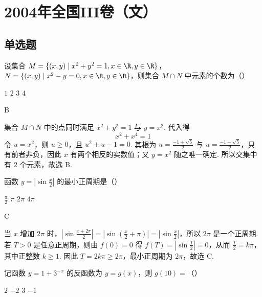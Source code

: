 \chapter{2004年全国III卷（文）}
\section{单选题}
\begin{problem}
设集合 \(M = \{(x, y) \mid x^2 + y^2 = 1, x \in \R, y \in \R\}\)，\(N = \{(x, y) \mid x^2 - y = 0, x \in \R, y \in \R\}\)，则集合 \(M \cap N\) 中元素的个数为（\quad）

\choices
    {\(1\)}
    {\(2\)}
    {\(3\)}
    {\(4\)}
\end{problem}

\begin{answer}
B
\end{answer}

\begin{solution}
集合 \(M\cap N\) 中的点同时满足 \(x^2+y^2=1\) 与 \(y=x^2\). 代入得
\[
x^2+x^4=1
\]
令 \(u=x^2\)，则 \(u\geqslant0\)，且 \(u^2+u-1=0\). 其根为 \(u=\frac{-1+\sqrt{5}}{2}\) 与 \(u=\frac{-1-\sqrt{5}}{2}\)，只有前者非负，因此 \(x\) 有两个相反的实数值；又 \(y=x^2\) 随之唯一确定. 所以交集中有 \(2\) 个元素，故选 B.
\end{solution}

\begin{problem}
函数 \( y = \left|\sin \frac{x}{2}\right| \) 的最小正周期是（\quad）

\choices
    {\(\frac{\pi}{2}\)}
    {\(\pi\)}
    {\(2\pi\)}
    {\(4\pi\)}
\end{problem}

\begin{answer}
C
\end{answer}

\begin{solution}
当 \(x\) 增加 \(2\pi\) 时，\(\left|\sin\frac{x+2\pi}{2}\right|=\left|\sin\left(\frac{x}{2}+\pi\right)\right|=\left|\sin\frac{x}{2}\right|\)，所以 \(2\pi\) 是一个正周期. 若 \(T>0\) 是任意正周期，则由 \(f(0)=0\) 得 \(f(T)=\left|\sin\frac{T}{2}\right|=0\)，从而 \(\frac{T}{2}=k\pi\)，其中正整数 \(k\geqslant1\). 因此 \(T=2k\pi\geqslant2\pi\)，最小正周期为 \(2\pi\)，故选 C.
\end{solution}

\begin{problem}
记函数 \( y = 1 + 3^{-x} \) 的反函数为 \( y = g(x) \)，则 \( g(10) = \)（\quad）

\choices
    {\(2\)}
    {\(-2\)}
    {\(3\)}
    {\(-1\)}
\end{problem}

